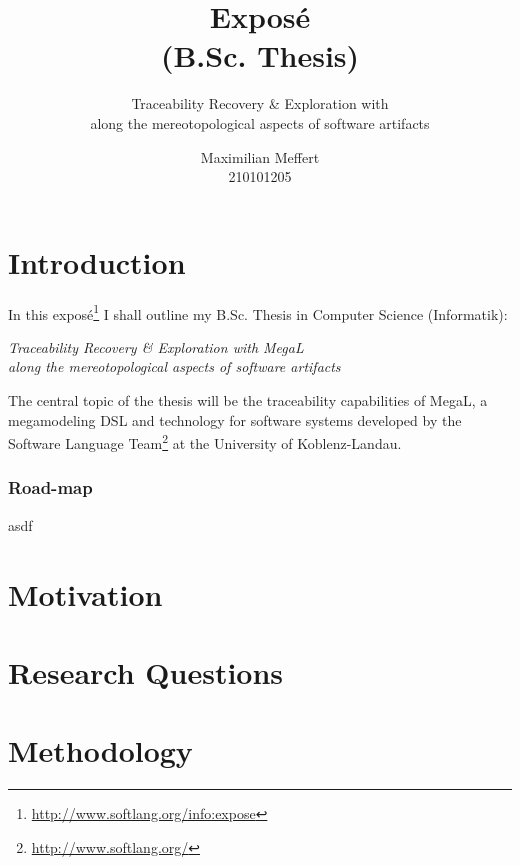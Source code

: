 \documentclass[runningheads,a4paper]{llncs}
\title{Exposé\\(B.Sc. Thesis)}
\subtitle{Traceability Recovery \& Exploration with \megal \\
along the mereotopological aspects of software artifacts}
\author{Maximilian Meffert\\210101205}
\institute{University of Koblen-Landau}
\newcommand{\megal}{\textsf{MegaL}}
\begin{document}
\maketitle
%



\section{Introduction}
In this exposé\footnote{\url{http://www.softlang.org/info:expose}} I shall outline my B.Sc. Thesis in Computer Science (Informatik):
\begin{center}
\it
Traceability Recovery \& Exploration with \megal \\
along the mereotopological aspects of software artifacts
\end{center}
The central topic of the thesis will be the traceability capabilities of \megal, a megamodeling DSL and technology for software systems developed by the Software Language Team\footnote{\url{http://www.softlang.org/}} at the University of Koblenz-Landau.


\subsubsection{Road-map}
asdf

%
%
%


\section{Motivation}
\section{Research Questions}
\section{Methodology}
\end{document}
